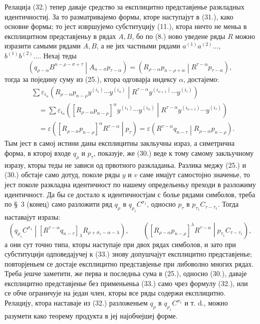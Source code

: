 ﻿\documentclass[11pt]{article}
\newcommand{\pair}[2]{\left(#1\middle|#2\right)}
\newcommand{\eps}{\varepsilon}
\begin{document}
Релација (32.) тепер даваје средство за експлицитно представјенье разкладных идентичностиј. За то разматривајемо формы, кторе наступајут в (31.), како основне формы; то јест извршујемо субституцију (11.), ктора ничто не меньа в експлицитном представјеньу в рядах $A,B$, бо по (8.) ново уведене ряды $R$ можно изразити самыми рядами $A,B$, а не јих частными рядами $a^{(1)}a^{(2)}\ldots$, $b^{(1)}b^{(2)}\ldots$. Нехај теды
\begin{equation}
 \pair{q_{\rho-\alpha}B^{n-\rho-\sigma+\tau}}{A_{n-\sigma}p_{\tau-\alpha}}
 =\pair{R_{\rho-\alpha}p_{n-\rho+\alpha}}{R^{\tau-\alpha}p_{\tau-\alpha}},
\tag{33}
\end{equation}
тогда за поједину суму из (25.), ктора одговарја индексу $\alpha$, достајемо:
\begin{equation}
\begin{aligned}
&\sum \eps_{i_\alpha}
\pair{R_{\rho-\alpha}p_{n-\rho}y^{(i_1)}\cdots y^{(i_\alpha)}}
{R^{\tau-\alpha}y^{(i_{\alpha+1})}\cdots y^{(i_\tau)}}\\
&\quad=\sum \eps_{i_\alpha}
\pair{[R_{\rho-\alpha}p_{n-\rho}]^\alpha
y^{(i_1)}\cdots y^{(i_\alpha)}}
{R^{\tau-\alpha}y^{(i_{\alpha+1})}\cdots y^{(i_\tau)}}\\
&\quad=\eps\pair{[R_{\rho-\alpha}p_{n-\rho}]^\alpha R^{\tau-\alpha}}{p_\tau}
 =\eps\pair{R^{\tau-\alpha}q_{n-\tau}}{R_{\rho-\alpha}p_{n-\rho}}.
\end{aligned}
\tag{34}
\end{equation}
Тым јест в самој истини даны експлицитны закльучны израз, а симетрична форма, в кторој входе $q_\rho$ и $p_\tau$, показује, же (30.) веде к тому самому закльучному изразу, кторы теды не зависи од првотного разкладаньа. Разлика меджу (25.) и (30.) обстаје само дотуд, поколе ряды $y$ и $v$ саме имајут самостојно значенье, то јест поколе разкладна идентичност по нашему определьеньу преходи в разложиму идентичност. Да бы се достало к идентичностјам с болье рядами симболов, треба по \S\ 3 (конец) само разложити ряд $q_\rho$ в $q_{\rho_1}C^{\sigma_1}$, односно $p_\tau$ в $p_{\tau_1}C_{\tau-\tau_1}$. Тогда наставајут изразы:
\begin{equation}
 \pair{q_{\rho_1}C^{\sigma_1}}
 {[R^{\tau-\alpha}q_{n-\tau}]_\lambda R_{\rho+\sigma_1-\alpha-\lambda}},
 \qquad
 \pair{[R_{\rho-\alpha}p_{n-\rho}]^\lambda R^{\tau-\alpha}}
 {p_{\tau_1}C_{\tau-\tau_1}},
\tag{35}
\end{equation}
а они сут точно типа, кторы наступаје при двох рядах симболов, и зато при субституцији одповедајучеј к (33.) знову допушчајут експлицитно представјенье; повторјеньем се достаје експлицитно представјенье при либоволно многих рядах. Треба јешче заметити, же перва и последньа сума в (25.), односно (30.), даваје експлицитно представјенье без применьеньа (33.) само чрез формулу (32.), или се обче ограничује на један член, кторы все ряды содержи експлицитно. Релацију, ктора наставаје из (32.) разложеньем $q_\rho$ в $q_{\rho_1}C^{\sigma_1}$ и т. d., можно разумети како теорему продукта в јеј најобчејшеј форме.
\end{document}
